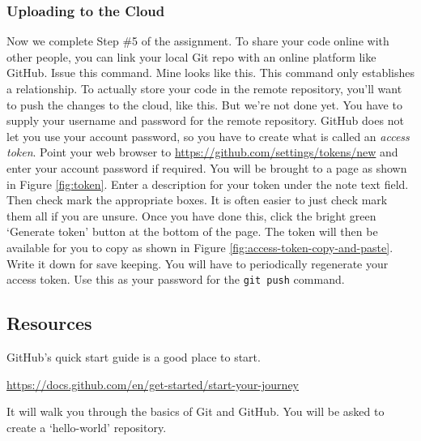 \documentclass{article}
\begin{document}
\subsubsection{Uploading to the Cloud}

Now we complete Step \#5 of the assignment.  To share your code online with
other people, you can link your local Git repo with an online platform like
GitHub. Issue this command.
%
%
Mine looks like this.
%
%
This command only establishes a relationship. To actually store your code in the
remote repository, you'll want to push the changes to the cloud, like this.
%
%
But we're not done yet.  You have to supply your username and password for the
remote repository. GitHub does not let you use your account password, so you
have to create what is called an \emph{access token}.  Point your web browser to
\url{https://github.com/settings/tokens/new} and enter your account password if
required. You will be brought to a page as shown in Figure \ref{fig:token}.
Enter a description for your token under the note text field. Then check mark
the appropriate boxes. It is often easier to just check mark them all if you are
unsure. Once you have done this, click the bright green `Generate token' button
at the bottom of the page.  The token will then be available for you to copy as
shown in Figure \ref{fig:access-token-copy-and-paste}.  Write it down for save
keeping. You will have to periodically regenerate your access token.  Use this
as your password for the \texttt{git push} command.


\subsection{Resources}

GitHub's quick start guide is a good place to start.
%
\begin{center}
	\url{https://docs.github.com/en/get-started/start-your-journey}
\end{center}
%
It will walk you through the basics of Git and GitHub. You will be asked to
create a `hello-world' repository.

\end{document}
